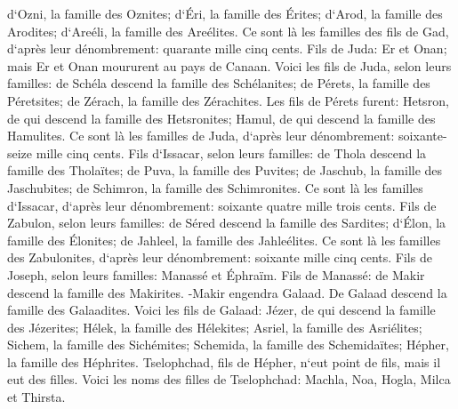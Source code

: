 \verse d`Ozni, la famille des Oznites; d`Éri, la famille des Érites; 
\verse d`Arod, la famille des Arodites; d`Areéli, la famille des Areélites. 
\verse Ce sont là les familles des fils de Gad, d`après leur dénombrement: quarante mille cinq cents. 
\verse Fils de Juda: Er et Onan; mais Er et Onan moururent au pays de Canaan. 
\verse Voici les fils de Juda, selon leurs familles: de Schéla descend la famille des Schélanites; de Pérets, la famille des Péretsites; de Zérach, la famille des Zérachites. 
\verse Les fils de Pérets furent: Hetsron, de qui descend la famille des Hetsronites; Hamul, de qui descend la famille des Hamulites. 
\verse Ce sont là les familles de Juda, d`après leur dénombrement: soixante-seize mille cinq cents. 
\verse Fils d`Issacar, selon leurs familles: de Thola descend la famille des Tholaïtes; de Puva, la famille des Puvites; 
\verse de Jaschub, la famille des Jaschubites; de Schimron, la famille des Schimronites. 
\verse Ce sont là les familles d`Issacar, d`après leur dénombrement: soixante quatre mille trois cents. 
\verse Fils de Zabulon, selon leurs familles: de Séred descend la famille des Sardites; d`Élon, la famille des Élonites; de Jahleel, la famille des Jahleélites. 
\verse Ce sont là les familles des Zabulonites, d`après leur dénombrement: soixante mille cinq cents. 
\verse Fils de Joseph, selon leurs familles: Manassé et Éphraïm. 
\verse Fils de Manassé: de Makir descend la famille des Makirites. -Makir engendra Galaad. De Galaad descend la famille des Galaadites. 
\verse Voici les fils de Galaad: Jézer, de qui descend la famille des Jézerites; Hélek, la famille des Hélekites; 
\verse Asriel, la famille des Asriélites; Sichem, la famille des Sichémites; 
\verse Schemida, la famille des Schemidaïtes; Hépher, la famille des Héphrites. 
\verse Tselophchad, fils de Hépher, n`eut point de fils, mais il eut des filles. Voici les noms des filles de Tselophchad: Machla, Noa, Hogla, Milca et Thirsta. 
